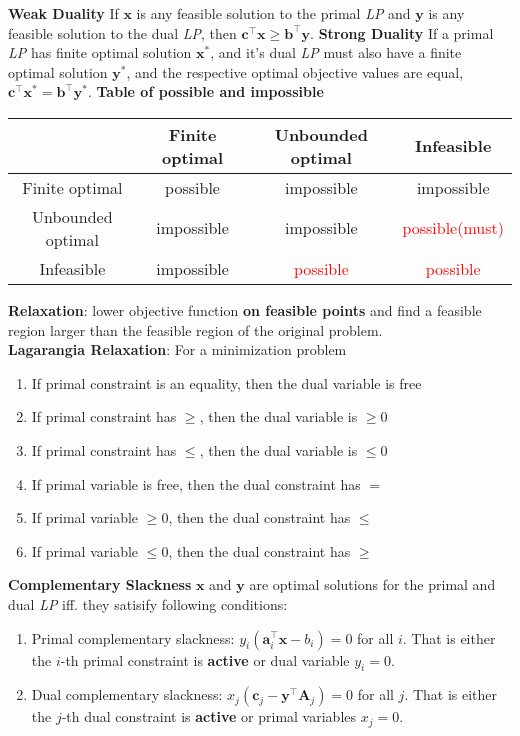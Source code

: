 \documentclass{article}
\def\x{\bm{x}}
\def\y{\bm{y}}
\def\a{\bm{a}}
\def\c{\bm{c}}
\def\A{\bm{A}}
\def\b{\bm{b}}
\def\y{\bm{y}}
\begin{document}
\textbf{Weak Duality} If $\x$ is any feasible solution to the primal \textit{LP} and $\y$ is any feasible solution to the dual \textit{LP}, then $\c^\top \x \ge \b^\top \y$.
\textbf{Strong Duality} If a primal \textit{LP} has finite optimal solution $\x^*$, and it's dual \textit{LP} must also have a finite optimal solution $\y^*$, and the respective optimal objective values are equal, $\c^\top \x^* = \b^\top \y^*$.
\textbf{Table of possible and impossible}
\begin{table}[]
    \centering
    \begin{tabular}{|c|c|c|c|}
    \hline
    & Finite optimal & Unbounded optimal & Infeasible \\
    \hline
    Finite optimal & possible & impossible & impossible \\
    \hline
    Unbounded optimal & impossible & impossible & \textcolor{red}{possible(must)} \\
    \hline
    Infeasible      & impossible & \textcolor{red}{possible} & \textcolor{red}{possible}\\
    \hline
    \end{tabular}
\end{table}
\textbf{Relaxation}: lower objective function \textbf{on feasible points} and find a feasible region larger than the feasible region of the original problem.\\
\textbf{Lagarangia Relaxation}: For a minimization problem
\begin{enumerate}
    \item If primal constraint is an equality, then the dual variable is free
    \item If primal constraint has $\ge$, then the dual variable is $\ge 0$
    \item If primal constraint has $\le$, then the dual variable is $\le 0$
    \item If primal variable is free, then the dual constraint has $=$
    \item If primal variable $\ge 0$, then the dual constraint has $\le$
    \item If primal variable $\le 0$, then the dual constraint has $\ge$
\end{enumerate}
\textbf{Complementary Slackness} $\x$ and $\y$ are optimal solutions for the primal and dual \textit{LP} iff. they satisify following conditions:
\begin{enumerate}
    \item Primal complementary slackness: $y_i(\a_{i}^{\top}\x-b_i)=0$ for all $i$. That is either the $i$-th primal constraint is \textbf{active} or dual variable $y_i=0$.
    \item Dual complementary slackness: $x_j(\c_j-\y^\top \A_j)=0$ for all $j$. That is either the $j$-th dual constraint is \textbf{active} or primal variables $x_j=0$.
\end{enumerate}
\end{document}
